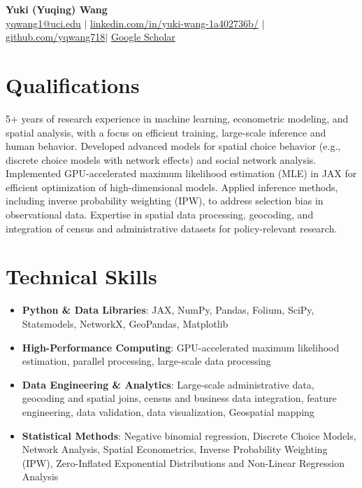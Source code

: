 \documentclass[letterpaper,10pt]{article}
\newcommand{\resumeItem}[1]{\item\small{#1}}
\newcommand{\resumeSubHeadingList}{\begin{itemize}[leftmargin=0.15in, label={}]}
\newcommand{\resumeSubHeadingListEnd}{\end{itemize}}
\begin{document}
\begin{center}
  \textbf{\Huge Yuki (Yuqing) Wang} \\\href{mailto:yqwang1@uci.edu}{yqwang1@uci.edu} $|$ 
  \href{https://www.linkedin.com/in/yuki-wang-1a402736b/}{linkedin.com/in/yuki-wang-1a402736b/} $|$
  \href{https://github.com/yqwang718}{github.com/yqwang718}$|$
  \href{https://scholar.google.com/citations?user=S5f5O1kAAAAJ&hl=en}{Google Scholar}
\end{center}


\section{Qualifications}
5+ years of research experience in machine learning, econometric modeling, and spatial analysis, with a focus on efficient training, large-scale inference and human behavior. Developed advanced models for spatial choice behavior (e.g., discrete choice models with network effects) and social network analysis. Implemented GPU-accelerated maximum likelihood estimation (MLE) in JAX for efficient optimization of high-dimensional models. Applied inference methods, including inverse probability weighting (IPW), to address selection bias in observational data. Expertise in spatial data processing, geocoding, and integration of census and administrative datasets for policy-relevant research. 

\section{Technical Skills}
\resumeSubHeadingList
  \resumeItem{\textbf{Python \& Data Libraries}: JAX, NumPy, Pandas, Folium, SciPy, Statsmodels, NetworkX, GeoPandas, Matplotlib}
  \resumeItem{\textbf{High-Performance Computing}: GPU-accelerated maximum likelihood estimation, parallel processing, large-scale data processing}
  \resumeItem{\textbf{Data Engineering \& Analytics}: Large-scale administrative data, geocoding and spatial joins, census and business data integration, feature engineering, data validation, data visualization, Geospatial mapping}
  \resumeItem{\textbf{Statistical Methods}: Negative binomial regression, Discrete Choice Models, Network Analysis, Spatial Econometrics, Inverse Probability Weighting (IPW), Zero-Inflated Exponential Distributions and Non-Linear Regression Analysis}
\resumeSubHeadingListEnd
\end{document}
